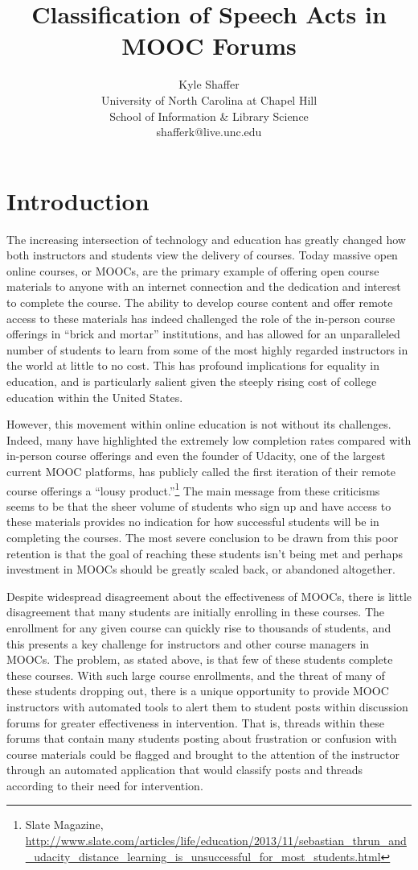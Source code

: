 \documentclass[twoside]{article}
\title{Classification of Speech Acts in MOOC Forums}
\author{Kyle Shaffer \\ 
University of North Carolina at Chapel Hill \\
School of Information \& Library Science \\
shafferk@live.unc.edu}
\date{}
\begin{document}
\maketitle

\section{Introduction}\label{sec:introduction}
The increasing intersection of technology and education has greatly changed how both instructors and students view the delivery of courses. Today massive open online courses, or MOOCs, are the primary example of offering open course materials to anyone with an internet connection and the dedication and interest to complete the course. The ability to develop course content and offer remote access to these materials has indeed challenged the role of the in-person course offerings in ``brick and mortar'' institutions, and has allowed for an unparalleled number of students to learn from some of the most highly regarded instructors in the world at little to no cost. This has profound implications for equality in education, and is particularly salient given the steeply rising cost of college education within the United States. 
\par
However, this movement within online education is not without its challenges. Indeed, many have highlighted the extremely low completion rates compared with in-person course offerings and even the founder of Udacity, one of the largest current MOOC platforms, has publicly called the first iteration of their remote course offerings a ``lousy product.''\footnote{Slate Magazine, \url{http://www.slate.com/articles/life/education/2013/11/sebastian_thrun_and_udacity_distance_learning_is_unsuccessful_for_most_students.html}} The main message from these criticisms seems to be that the sheer volume of students who sign up and have access to these materials provides no indication for how successful students will be in completing the courses. The most severe conclusion to be drawn from this poor retention is that the goal of reaching these students isn't being met and perhaps investment in MOOCs should be greatly scaled back, or abandoned altogether. 
\par
Despite widespread disagreement about the effectiveness of MOOCs, there is little disagreement that many students are initially enrolling in these courses. The enrollment for any given course can quickly rise to thousands of students, and this presents a key challenge for instructors and other course managers in MOOCs. The problem, as stated above, is that few of these students complete these courses. With such large course enrollments, and the threat of many of these students dropping out, there is a unique opportunity to provide MOOC instructors with automated tools to alert them to student posts within discussion forums for greater effectiveness in intervention. That is, threads within these forums that contain many students posting about frustration or confusion with course materials could be flagged and brought to the attention of the instructor through an automated application that would classify posts and threads according to their need for intervention. 
\end{document}

